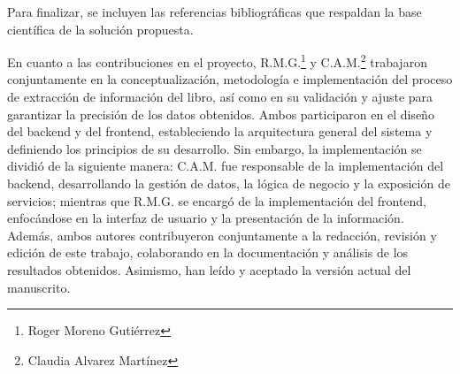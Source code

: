 Para finalizar, se incluyen las referencias bibliográficas que respaldan la base 
científica de la solución propuesta.

En cuanto a las contribuciones en el proyecto, R.M.G.\footnote{Roger Moreno Gutiérrez} y C.A.M.\footnote{Claudia Alvarez Martínez} 
trabajaron conjuntamente en la conceptualización, metodología e implementación del proceso de extracción de información del libro, 
así como en su validación y ajuste para garantizar la precisión de los datos obtenidos. Ambos participaron 
en el diseño del backend y del frontend, estableciendo la arquitectura general del sistema y definiendo 
los principios de su desarrollo. Sin embargo, la implementación se dividió de la siguiente manera: 
C.A.M. fue responsable de la implementación del backend, desarrollando la gestión de datos, 
la lógica de negocio y la exposición de servicios; mientras que R.M.G. se encargó de la implementación 
del frontend, enfocándose en la interfaz de usuario y la presentación de la información. Además, ambos 
autores contribuyeron conjuntamente a la redacción, revisión y edición de este trabajo, colaborando en la 
documentación y análisis de los resultados obtenidos. Asimismo, han leído y aceptado la versión actual del manuscrito.